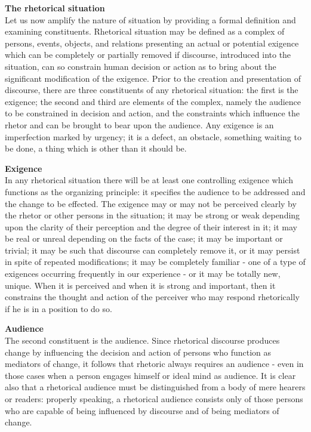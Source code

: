 \documentclass[]{book}
\theoremstyle{definition}
\theoremstyle{definition}
\theoremstyle{definition}
\theoremstyle{remark}
\begin{document}
\textbf{The rhetorical situation}\\
Let us now amplify the nature of situation by providing a formal
definition and examining constituents. Rhetorical situation may be
defined as a complex of persons, events, objects, and relations
presenting an actual or potential exigence which can be completely or
partially removed if discourse, introduced into the situation, can so
constrain human decision or action as to bring about the significant
modification of the exigence. Prior to the creation and presentation of
discourse, there are three constituents of any rhetorical situation: the
first is the exigence; the second and third are elements of the complex,
namely the audience to be constrained in decision and action, and the
constraints which influence the rhetor and can be brought to bear upon
the audience. Any exigence is an imperfection marked by urgency; it is a
defect, an obstacle, something waiting to be done, a thing which is
other than it should be.

\textbf{Exigence}\\
In any rhetorical situation there will be at least one controlling
exigence which functions as the organizing principle: it specifies the
audience to be addressed and the change to be effected. The exigence may
or may not be perceived clearly by the rhetor or other persons in the
situation; it may be strong or weak depending upon the clarity of their
perception and the degree of their interest in it; it may be real or
unreal depending on the facts of the case; it may be important or
trivial; it may be such that discourse can completely remove it, or it
may persist in spite of repeated modifications; it may be completely
familiar - one of a type of exigences occurring frequently in our
experience - or it may be totally new, unique. When it is perceived and
when it is strong and important, then it constrains the thought and
action of the perceiver who may respond rhetorically if he is in a
position to do so.

\textbf{Audience}\\
The second constituent is the audience. Since rhetorical discourse
produces change by influencing the decision and action of persons who
function as mediators of change, it follows that rhetoric always
requires an audience - even in those cases when a person engages himself
or ideal mind as audience. It is clear also that a rhetorical audience
must be distinguished from a body of mere hearers or readers: properly
speaking, a rhetorical audience consists only of those persons who are
capable of being influenced by discourse and of being mediators of
change.
\end{document}

